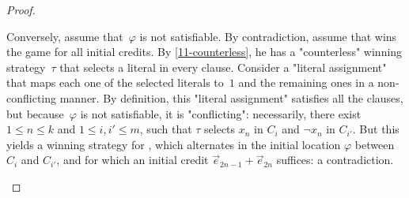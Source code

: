 \begin{proof}
\begin{scope}
    Conversely, assume that~$\varphi$ is not satisfiable.  By
    contradiction, assume that \Adam wins the game for all initial
    credits.  By \cref{11-counterless}, he has a "counterless" winning
    strategy~$\tau$ that selects a literal in every clause.  Consider
    a "literal assignment" that maps each one of the selected literals
    to~$1$ and the remaining ones in a non-conflicting manner.  By
    definition, this "literal assignment" satisfies all the clauses,
    but because~$\varphi$ is not satisfiable, it is "conflicting":
    necessarily, there exist $1\leq n\leq k$ and $1\leq i,i'\leq m$,
    such that $\tau$ selects $x_n$ in $C_i$ and $\neg x_n$ in
    $C_{i'}$.  But this yields a winning strategy for \Eve, which
    alternates in the initial location $\varphi$ between $C_{i}$
    and $C_{i'}$, and for which an initial credit
    $\vec e_{2n-1}+\vec e_{2n}$ suffices: a contradiction.
  \end{scope}

\end{proof}
